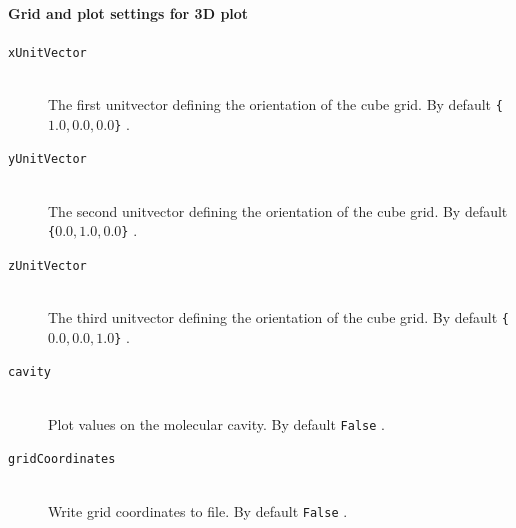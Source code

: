 \documentclass[bibliography=totocnumbered,a4paper,10pt,oneside]{scrbook}
\newcommand{\ttt}[1]{%
  \begingroup\setlength{\fboxsep}{1pt}%
  \colorbox{serenity-green!30}{\texttt{\hspace*{2pt}\vphantom{(g}#1\hspace*{2pt}}}%
  \endgroup
}
\begin{document}
\paragraph{Grid and plot settings for 3D plot}
\begin{description}
    \item [\texttt{xUnitVector}]\hfill \\
    The first unitvector defining the orientation of the cube grid. By default \ttt{\{$1.0, 0.0, 0.0$\}}.
    \item [\texttt{yUnitVector}]\hfill \\
    The second unitvector defining the orientation of the cube grid. By default \ttt{\{$0.0, 1.0, 0.0$\}}.
    \item [\texttt{zUnitVector}]\hfill \\
    The third unitvector defining the orientation of the cube grid. By default \ttt{\{$0.0, 0.0, 1.0$\}}.
    \item [\texttt{cavity}]\hfill \\
    Plot values on the molecular cavity. By default \ttt{False}.
    \item [\texttt{gridCoordinates}]\hfill \\
    Write grid coordinates to file. By default \ttt{False}.
\end{description}
\end{document}
